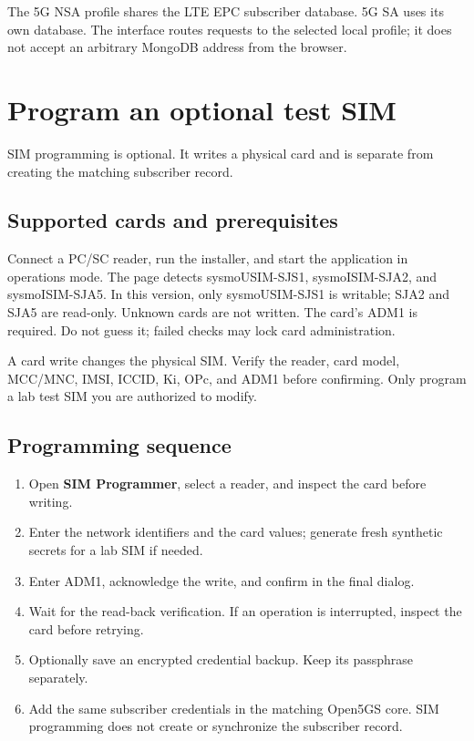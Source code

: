 \documentclass[11pt,a4paper,oneside]{article}
\newcommand{\manualsection}[2]{\clearpage\section{#1}\label{#2}}
\begin{document}
The 5G NSA profile shares the LTE EPC subscriber database. 5G SA uses its own database. The interface routes requests to the selected local profile; it does not accept an arbitrary MongoDB address from the browser.

\manualsection{Program an optional test SIM}{sim}
SIM programming is optional. It writes a physical card and is separate from creating the matching subscriber record.

\subsection{Supported cards and prerequisites}
Connect a PC/SC reader, run the installer, and start the application in operations mode. The page detects sysmoUSIM-SJS1, sysmoISIM-SJA2, and sysmoISIM-SJA5. In this version, only sysmoUSIM-SJS1 is writable; SJA2 and SJA5 are read-only. Unknown cards are not written. The card's ADM1 is required. Do not guess it; failed checks may lock card administration.

\begin{dangerbox}
A card write changes the physical SIM. Verify the reader, card model, MCC/MNC, IMSI, ICCID, Ki, OPc, and ADM1 before confirming. Only program a lab test SIM you are authorized to modify.
\end{dangerbox}

\subsection{Programming sequence}
\begin{enumerate}
  \item Open \textbf{SIM Programmer}, select a reader, and inspect the card before writing.
  \item Enter the network identifiers and the card values; generate fresh synthetic secrets for a lab SIM if needed.
  \item Enter ADM1, acknowledge the write, and confirm in the final dialog.
  \item Wait for the read-back verification. If an operation is interrupted, inspect the card before retrying.
  \item Optionally save an encrypted credential backup. Keep its passphrase separately.
  \item Add the same subscriber credentials in the matching Open5GS core. SIM programming does not create or synchronize the subscriber record.
\end{enumerate}
\end{document}
